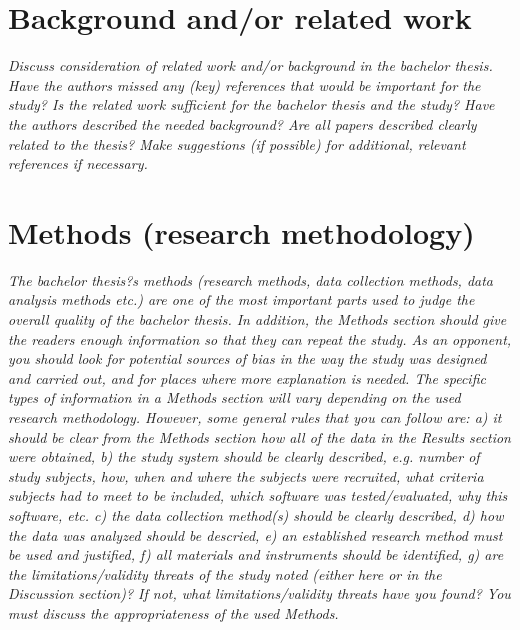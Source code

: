 \documentclass[conference]{IEEEtran}
\begin{document}
\section{Background and\slash or related work}
\textit{Discuss consideration of related work and/or background in the bachelor thesis. Have the authors missed any (key) references that would be important for the study? Is the related work sufficient for the bachelor thesis and the study? Have the authors described the needed background? Are all papers described clearly related to the thesis? Make suggestions (if possible) for additional, relevant references if necessary.}


\section{Methods (research methodology)}
\textit{The bachelor thesis?s methods (research methods, data collection methods, data analysis methods etc.) are one of the most important parts used to judge the overall quality of the bachelor thesis. In addition, the Methods section should give the readers enough information so that they can repeat the study. As an opponent, you should look for potential sources of bias in the way the study was designed and carried out, and for places where more explanation is needed. The specific types of information in a Methods section will vary depending on the used research methodology. However, some general rules that you can follow are: a) it should be clear from the Methods section how all of the data in the Results section were obtained, b) the study system should be clearly described, e.g. number of study subjects, how, when and where the subjects were recruited, what criteria subjects had to meet to be included, which software was tested/evaluated, why this software, etc. c) the data collection method(s) should be clearly described, d) how the data was analyzed should be descried, e) an established research method must be used and justified, f) all materials and instruments should be identified, g) are the limitations/validity threats of the study noted (either here or in the Discussion section)? If not, what limitations/validity threats have you found?  You must discuss the appropriateness of the used Methods.}
\end{document}

